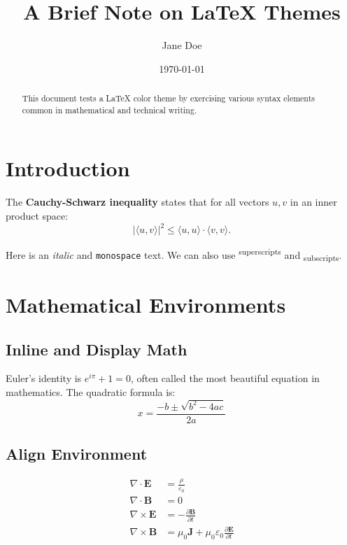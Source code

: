 \documentclass[12pt,a4paper]{article}
\title{A Brief Note on \LaTeX{} Themes}
\author{Jane Doe}
\date{\today}
\theoremstyle{definition}
\begin{document}
\maketitle

\begin{abstract}
	This document tests a \LaTeX{} color theme by exercising various syntax
	elements common in mathematical and technical writing.
\end{abstract}

\tableofcontents
\newpage

\section{Introduction}

The \textbf{Cauchy-Schwarz inequality} states that for all vectors
$u, v$ in an inner product space:
\[
	|\langle u, v \rangle|^2 \leq \langle u, u \rangle \cdot \langle v, v \rangle.
\]

Here is an \emph{italic} and \texttt{monospace} text. We can also use
\textsuperscript{superscripts} and \textsubscript{subscripts}.

\section{Mathematical Environments}

\subsection{Inline and Display Math}

Euler's identity is $e^{i\pi} + 1 = 0$, often called the most beautiful
equation in mathematics. The quadratic formula is:
\[
	x = \frac{-b \pm \sqrt{b^2 - 4ac}}{2a}
\]

\subsection{Align Environment}

\begin{align}
	\nabla \cdot \mathbf{E}  & = \frac{\rho}{\varepsilon_0} \label{eq:gauss}                                                     \\
	\nabla \cdot \mathbf{B}  & = 0 \label{eq:no-monopole}                                                                        \\
	\nabla \times \mathbf{E} & = -\frac{\partial \mathbf{B}}{\partial t} \label{eq:faraday}                                      \\
	\nabla \times \mathbf{B} & = \mu_0 \mathbf{J} + \mu_0 \varepsilon_0 \frac{\partial \mathbf{E}}{\partial t} \label{eq:ampere}
\end{align}
\end{document}
